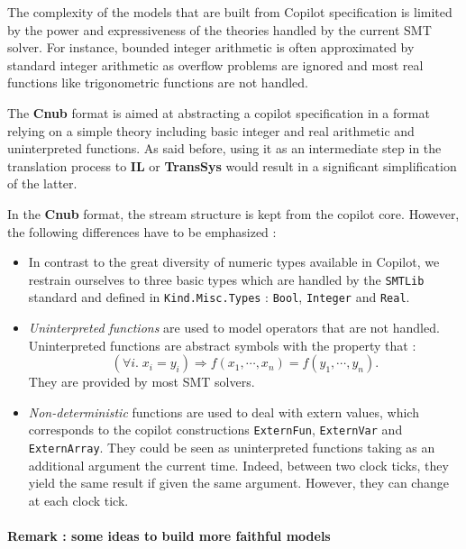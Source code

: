 The complexity of the models that are built from Copilot specification is limited by the power and expressiveness of the theories handled by the current SMT solver. For instance, bounded integer arithmetic is often approximated by standard integer arithmetic as overflow problems are ignored and most real functions like trigonometric functions are not handled.

The \textbf{Cnub} format is aimed at abstracting a copilot specification in a format relying on a simple theory including basic integer and real arithmetic and uninterpreted functions. As said before, using it as an intermediate step in the translation process to \textbf{IL} or \textbf{TransSys} would result in a significant simplification of the latter.


In the \textbf{Cnub} format, the stream structure is kept from the copilot core. However, the following differences have to be emphasized :

\begin{itemize}
\item In contrast to the great diversity of numeric types available in Copilot, we restrain ourselves to three basic types which are handled by the \texttt{SMTLib} standard and defined in \texttt{Kind.Misc.Types} : \texttt{Bool}, \texttt{Integer} and \texttt{Real}.


\item \textit{Uninterpreted functions} are used to model operators that are not handled. Uninterpreted functions are abstract symbols with the property that : $$ \left( \forall i . \; x_i = y_i \right) \Longrightarrow f(x_1, \cdots, x_n) = f(y_1, \cdots, y_n). $$ They are provided by most SMT solvers.

\item \textit{Non-deterministic} functions are used to deal with extern values, which corresponds to the copilot constructions \texttt{ExternFun}, \texttt{ExternVar} and \texttt{ExternArray}. They could be seen as uninterpreted functions taking as an additional argument the current time. Indeed, between two clock ticks, they yield the same result if given the same argument. However, they can change at each clock tick.

\end{itemize}


\paragraph{Remark : some ideas to build more faithful models}

